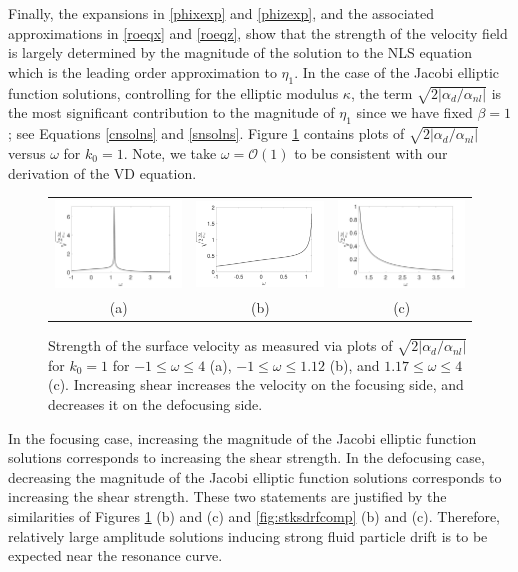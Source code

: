 \documentclass{JFM_Style/jfm}
\begin{document}
Finally, the expansions in \eqref{phixexp} and \eqref{phizexp}, and the associated approximations in \eqref{roeqx} and \eqref{roeqz}, show that the strength of the velocity field is largely determined by the magnitude of the solution to the NLS equation which is the leading order approximation to $\eta_{1}$.  In the case of the Jacobi elliptic function solutions, controlling for the elliptic modulus $\kappa$, the term $\sqrt{2|\alpha_{d}/\alpha_{nl}|}$ is the most significant contribution to the magnitude of $\eta_{1}$ since we have fixed $\beta=1$; see Equations \eqref{cnsolns} and \eqref{snsolns}.  Figure \ref{fig:ampcomps} contains plots of $\sqrt{2|\alpha_{d}/\alpha_{nl}|}$ versus $\omega$ for $k_0=1$.  Note, we take $\omega = \mathcal{O}(1)$ to be consistent with our derivation of the VD equation.  
\begin{figure}
\centering
\begin{tabular}{ccc}
\includegraphics[width=.32\textwidth]{amp_factor_k0_1_wide_range} & \includegraphics[width=.32\textwidth]{amp_factor_k0_1_n1_to_1pt12} & \includegraphics[width=.32\textwidth]{amp_factor_k0_1_1pt2_to_4}\\
(a) & (b) & (c)
\end{tabular}
\caption{\small Strength of the surface velocity as measured via plots of $\sqrt{2|\alpha_{d}/\alpha_{nl}|}$ for $k_{0}=1$ for $-1\leq \omega \leq 4$ (a), $-1\leq \omega \leq 1.12$ (b), and $1.17\leq \omega \leq 4$ (c).  Increasing shear increases the velocity on the focusing side, and decreases it on the defocusing side.}
\label{fig:ampcomps}
\end{figure}
In the focusing case, increasing the magnitude of the Jacobi elliptic function solutions corresponds to increasing the shear strength.  In the defocusing case, decreasing the magnitude of the Jacobi elliptic function solutions corresponds to increasing the shear strength.  These two statements are justified by the similarities of Figures \ref{fig:ampcomps} (b) and (c) and \ref{fig:stksdrfcomp} (b) and (c).  Therefore, relatively large amplitude solutions inducing strong fluid particle drift is to be expected near the resonance curve.
\end{document}
